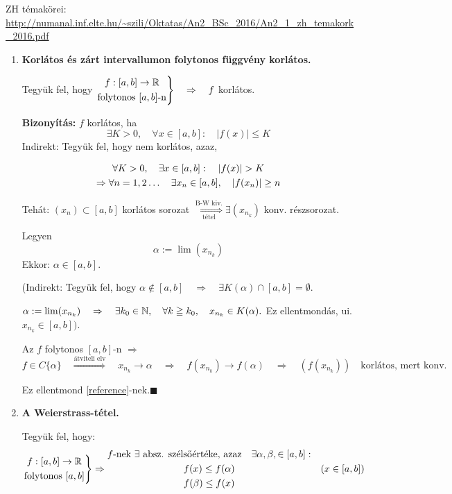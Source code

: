 \documentclass[a4paper,11.5pt]{article}
\begin{document}
	ZH témakörei: \url{http://numanal.inf.elte.hu/~szili/Oktatas/An2_BSc_2016/An2_1_zh_temakork_2016.pdf}
	\begin{enumerate}
		\item \textbf{Korlátos és zárt intervallumon folytonos függvény korlátos.}
		
		Tegyük fel, hogy 
		$\left.
		\begin{gathered}
		f:[a,b]\to\mathbb{R} \\
		\text{folytonos } [a,b]\text{-n}
		\end{gathered}
		\right\}\quad  \Rightarrow \quad f $ korlátos.
		\bigskip
		
		\textbf{Bizonyítás:} $f$ korlátos, ha
		\[ \exists K>0, \quad \forall x \in [a,b]: \quad |f(x)|\leq K \]
		Indirekt: Tegyük fel, hogy nem korlátos, azaz, 
		
		\begin{gather}
		\forall K>0, \quad \exists x \in [a,b]: \quad |f(x)|> K \notag\\
		\Rightarrow \forall n = 1,2\ldots \quad \exists x_n \in [a,b], \quad |f(x_n)|\geq n\label{reference} 
		\end{gather} 
		
		Tehát: $(x_n)\subset[a,b]$ korlátos sorozat $\overset{\text{B-W kiv.}}{\underset{\text{tétel}}{\Longrightarrow}} \exists (x_{n_k})$ konv. részsorozat. 
		
		Legyen
		\[ \alpha:=\lim(x_{n_k}) \]
		Ekkor: $\alpha\in[a,b]$.\quad
		
		(Indirekt: Tegyük fel, hogy $\alpha \notin [a,b] \quad \Rightarrow \quad \exists K (\alpha) \cap[a,b] = \emptyset$.
		
		$\alpha:=\lim(x_{n_k})\quad  \Rightarrow \quad \exists k_0\in\mathbb{N},\quad \forall k\geqq k_0, \quad x_{n_k}\in K(\alpha).$ 
		Ez ellentmondás, ui. $x_{n_k}\in[a,b])$.
		\medskip
		
		Az $f$ folytonos $[a,b]$-n $\Rightarrow $
		\[ f\in C \{\alpha\}\quad \overset{\text{átviteli elv}}{\Rightarrow} \quad x_{n_k} \to \alpha \quad \Rightarrow\quad  f(x_{n_k}) \to f(\alpha)\quad  \Rightarrow \quad \left(f(x_{n_k})\right) \quad \text{korlátos, mert konv.}\]
		
		Ez ellentmond \ref{reference}-nek.\quad $\blacksquare$
		\item \textbf{A Weierstrass-tétel.}
		
		Tegyük fel, hogy:
		\[ \left.
		\begin{gathered} 
		f: [a,b]\to\mathbb{R} \\
		\text{folytonos } [a,b] 
		\end{gathered}
		\right\} \Rightarrow
		\begin{gathered}
		\text{$f$-nek $\exists$ absz. szélsőértéke, azaz\quad }\exists \alpha, \beta, \in [a,b]: \\
		f(x) \leq f(\alpha) \\
		f(\beta) \leq f(x)
		\end{gathered}\quad (x\in[a,b])\]
		

\end{enumerate}
\end{document}
